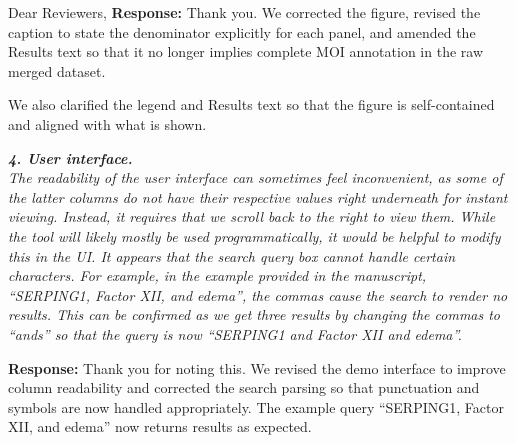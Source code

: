 \documentclass[12pt,a4paper]{letter}
\begin{document}
\begin{letter}{Dear Reviewers,}
\textbf{Response:} Thank you. We corrected the figure, revised the caption to state the denominator explicitly for each panel, and amended the Results text so that it no longer implies complete MOI annotation in the raw merged dataset.

We also clarified the legend and Results text so that the figure is self-contained and aligned with what is shown.

%
%

\textit{\textbf{4. User interface.}\\
The readability of the user interface can sometimes feel inconvenient, as some of the latter columns do not have their respective values right underneath for instant viewing. Instead, it requires that we scroll back to the right to view them. While the tool will likely mostly be used programmatically, it would be helpful to modify this in the UI.
It appears that the search query box cannot handle certain characters. For example, in the example provided in the manuscript, “SERPING1, Factor XII, and edema”, the commas cause the search to render no results. This can be confirmed as we get three results by changing the commas to “ands” so that the query is now “SERPING1 and Factor XII and edema”.
}

\textbf{Response:} Thank you for noting this. We revised the demo interface to improve column readability and corrected the search parsing so that punctuation and symbols are now handled appropriately. The example query “SERPING1, Factor XII, and edema” now returns results as expected.


\end{letter}
\end{document}
